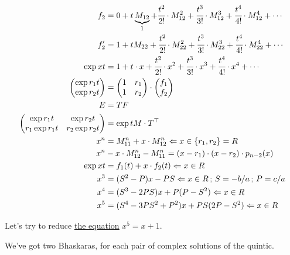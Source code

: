 \documentclass[12pt,a4paper]{article}
\begin{document}
\begin{align}
 f_2 &= 0 + t\underbrace{M_{12}}_{1} + \cfrac{t^2}{2!}\cdot M^2_{12} + \cfrac{t^3}{3!}\cdot M^3_{12} + \cfrac{t^4}{4!}\cdot M^4_{12} + \cdots \\
 f_2' &= 1 + tM_{22} + \cfrac{t^2}{2!}\cdot M^2_{22} + \cfrac{t^3}{3!}\cdot M^3_{22} + \cfrac{t^4}{4!}\cdot M^4_{22} + \cdots \\
 \exp xt &= 1 + t\cdot x + \cfrac{t^2}{2!}\cdot x^2 + \cfrac{t^3}{3!}\cdot x^3 + \cfrac{t^4}{4!}\cdot x^4 + \cdots \\
 \left(\begin{matrix}\exp{r_1 t} \\ \exp{r_2 t} \end{matrix}\right) &= \left(\begin{matrix}1 & r_1 \\ 1 & r_2 \end{matrix}\right) \cdot \left(\begin{matrix}f_1 \\ f_2 \end{matrix}\right) \\
E &= T F \\
 \left(\begin{matrix}\exp{r_1 t} & \exp{r_2 t} \\ r_1 \exp{r_1 t} & r_2 \exp{r_2 t} \end{matrix}\right) &= \exp tM \cdot T^\top \\
x^n &= M_{11}^n + x \cdot M_{12}^n \Leftarrow  x \in \{ r_1, r_2 \} = R \\
x^n &- x \cdot M_{12}^n - M_{11}^n = (x - r_1) \cdot (x - r_2) \cdot p_{n - 2}(x) \\
\exp xt &= f_1(t) + x\cdot f_2(t) \Leftarrow x \in R \\
x^3 &= (S^2 - P) x - PS \Leftarrow  x \in R\,;\,S = -b/a\,;\,P = c/a \\
x^4 &= (S^3 - 2 P S) x  + P(P - S^2) \Leftarrow  x \in R \\
x^5 &= (S^4 - 3 P S^2 + P^2) x + PS(2P - S^2) \Leftarrow  x \in R
\end{align}

\vspace{3mm}

Let's try to reduce \href{https://www.wolframalpha.com/input/?i=1+%3D+S*P*(2P+-+S%5E2);+1+%3D+S%5E4+-+3*+P*+S%5E2+%2B+P%5E2}{\color{blue}\underline{the equation}} $x^5 = x + 1$.

We've got two Bhaskaras, for each pair of complex solutions of the quintic.
\end{document}
